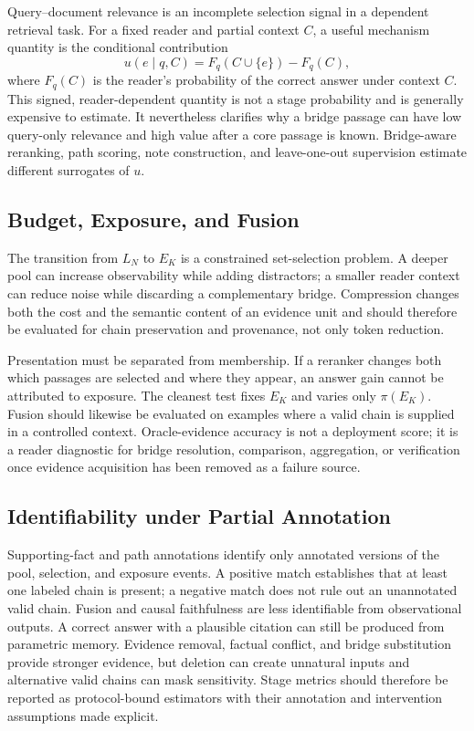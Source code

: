 \documentclass[manuscript,review]{acmart}
\theoremstyle{definition}
\theoremstyle{plain}
\theoremstyle{remark}
\begin{document}
Query--document relevance is an incomplete selection signal in a dependent
retrieval task. For a fixed reader and partial context $C$, a useful mechanism
quantity is the conditional contribution
\begin{equation}
u(e\mid q,C)=F_q(C\cup\{e\})-F_q(C),
\end{equation}
where $F_q(C)$ is the reader's probability of the correct answer under
context $C$. This signed, reader-dependent quantity is not a stage probability
and is generally expensive to estimate. It nevertheless clarifies why a
bridge passage can have low query-only relevance and high value after a core
passage is known. Bridge-aware reranking, path scoring, note construction,
and leave-one-out supervision estimate different surrogates of $u$.

\subsection{Budget, Exposure, and Fusion}
\label{subsec:fusion_program}

The transition from $L_N$ to $E_K$ is a constrained set-selection problem.
A deeper pool can increase observability while adding distractors; a smaller
reader context can reduce noise while discarding a complementary bridge.
Compression changes both the cost and the semantic content of an evidence
unit and should therefore be evaluated for chain preservation and provenance,
not only token reduction.

Presentation must be separated from membership. If a reranker changes both
which passages are selected and where they appear, an answer gain cannot be
attributed to exposure. The cleanest test fixes $E_K$ and varies only
$\pi(E_K)$. Fusion should likewise be evaluated on examples where a valid
chain is supplied in a controlled context. Oracle-evidence accuracy is not a
deployment score; it is a reader diagnostic for bridge resolution,
comparison, aggregation, or verification once evidence acquisition has been
removed as a failure source.

\subsection{Identifiability under Partial Annotation}

Supporting-fact and path annotations identify only annotated versions of the
pool, selection, and exposure events. A positive match establishes that at
least one labeled chain is present; a negative match does not rule out an
unannotated valid chain. Fusion and causal faithfulness are less identifiable
from observational outputs. A correct answer with a plausible citation can
still be produced from parametric memory. Evidence removal, factual conflict,
and bridge substitution provide stronger evidence, but deletion can create
unnatural inputs and alternative valid chains can mask sensitivity. Stage
metrics should therefore be reported as protocol-bound estimators with their
annotation and intervention assumptions made explicit.
\end{document}

